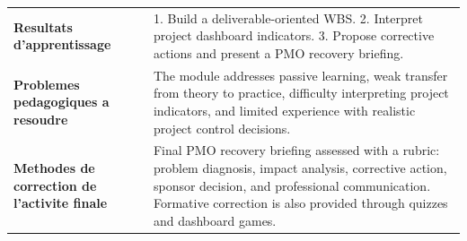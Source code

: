 \documentclass[11pt,a4paper]{article}
\begin{document}
\begin{longtable}{>{\bfseries}p{4.6cm}p{9.9cm}}
Resultats d'apprentissage & 1. Build a deliverable-oriented WBS. 2. Interpret project dashboard indicators. 3. Propose corrective actions and present a PMO recovery briefing. \\
Problemes pedagogiques a resoudre & The module addresses passive learning, weak transfer from theory to practice, difficulty interpreting project indicators, and limited experience with realistic project control decisions. \\
Methodes de correction de l'activite finale & Final PMO recovery briefing assessed with a rubric: problem diagnosis, impact analysis, corrective action, sponsor decision, and professional communication. Formative correction is also provided through quizzes and dashboard games. \\
\end{longtable}
\end{document}
